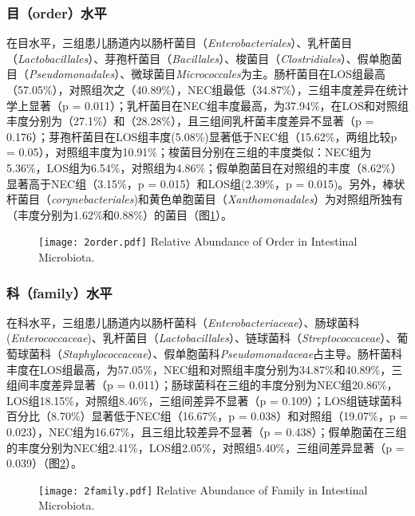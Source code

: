 {{    \subsubsection{目（order）水平}
    在目水平，三组患儿肠道内以肠杆菌目（\textit{Enterobacteriales}）、乳杆菌目（\textit{Lactobacillales}）、芽孢杆菌目（\textit{Bacillales}）、梭菌目（\textit{Clostridiales}）、假单胞菌目（\textit{Pseudomonadales}）、微球菌目\textit{Micrococcales}为主。肠杆菌目在LOS组最高（57.05\%），对照组次之（40.89\%），NEC组最低（34.87\%），三组丰度差异在统计学上显著（p = 0.011）；乳杆菌目在NEC组丰度最高，为37.94\%，在LOS和对照组丰度分别为（27.1\%）和（28.28\%），且三组间乳杆菌丰度差异不显著（p = 0.176）；芽孢杆菌目在LOS组丰度(5.08\%)显著低于NEC组（15.62\%，两组比较p = 0.05），对照组丰度为10.91\%；梭菌目分别在三组的丰度类似：NEC组为5.36\%，LOS组为6.54\%，对照组为4.86\%；假单胞菌目在对照组的丰度（8.62\%）显著高于NEC组（3.15\%，p = 0.015）和LOS组(2.39\%，p = 0.015)。另外，棒状杆菌目（\textit{corynebacteriales})和黄色单胞菌目（\textit{Xanthomonadales}）为对照组所独有（丰度分别为1.62\%和0.88\%）的菌目（图\ref{fig:2order}）。
      \begin{figure}[!htp]
        \centering
        \texttt{[image: 2order.pdf]}
          {Relative Abundance of Order in Intestinal Microbiota.}
        \label{fig:2order}
      \end{figure}

    \subsubsection{科（family）水平}
    在科水平，三组患儿肠道内以肠杆菌科（\textit{Enterobacteriaceae}）、肠球菌科(\textit{Enterococcaceae})、乳杆菌目（\textit{Lactobacillales}）、链球菌科（\textit{Streptococcaceae}）、葡萄球菌科（\textit{Staphylococcaceae}）、假单胞菌科\textit{Pseudomonadaceae}占主导。肠杆菌科丰度在LOS组最高，为57.05\%，NEC组和对照组丰度分别为34.87\%和40.89\%，三组间丰度差异显著（p = 0.011）；肠球菌科在三组的丰度分别为NEC组20.86\%，LOS组18.15\%，对照组8.46\%，三组间差异不显著（p = 0.109）；LOS组链球菌科百分比（8.70\%）显著低于NEC组（16.67\%，p = 0.038）和对照组（19.07\%，p = 0.023），NEC组为16.67\%，且三组比较差异不显著（p = 0.438）；假单胞菌在三组的丰度分别为NEC组2.41\%，LOS组2.05\%，对照组5.40\%，三组间差异显著（p = 0.039）（图\ref{fig:2family}）。
      \begin{figure}[!htp]
        \centering
        \texttt{[image: 2family.pdf]}
          {Relative Abundance of Family in Intestinal Microbiota.}
        \label{fig:2family}
      \end{figure}

}}
